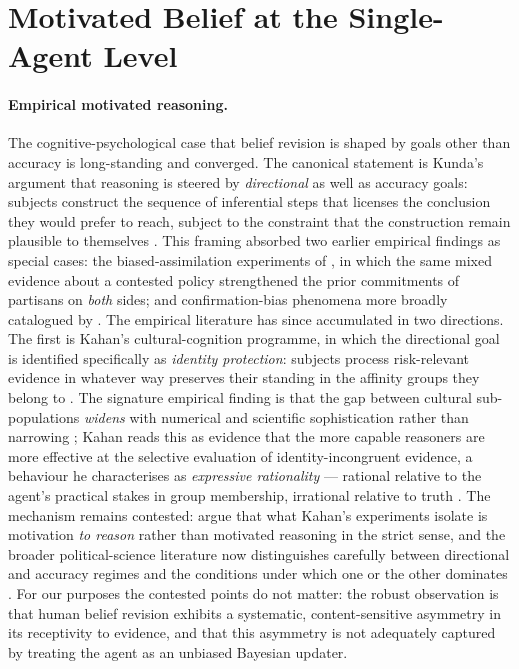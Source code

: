\section{Motivated Belief at the Single-Agent Level}
\label{sec:motivatedbelief}

\paragraph{Empirical motivated reasoning.}
The cognitive-psychological case that belief revision is shaped by
goals other than accuracy is long-standing and converged. The
canonical statement is Kunda's argument that reasoning is steered by
\emph{directional} as well as accuracy goals: subjects construct the
sequence of inferential steps that licenses the conclusion they would
prefer to reach, subject to the constraint that the construction
remain plausible to themselves \citep{kunda1990MotivatedReasoning}.
This framing absorbed two earlier empirical findings as special
cases: the biased-assimilation experiments of
\citet{lordRossLepper1979BiasedAssimilation}, in which the same
mixed evidence about a contested policy strengthened the prior
commitments of partisans on \emph{both} sides; and confirmation-bias
phenomena more broadly catalogued by \citet{nickerson1998ConfirmationBias}.
The empirical literature has since accumulated in two directions.
The first is Kahan's cultural-cognition programme, in which the
directional goal is identified specifically as \emph{identity
protection}: subjects process risk-relevant evidence in whatever way
preserves their standing in the affinity groups they belong to
\citep{Kahan2007_1, Kahan2017_4}. The signature empirical finding is
that the gap between cultural sub-populations \emph{widens} with
numerical and scientific sophistication rather than narrowing
\citep{Kahan2017_2}; Kahan reads this as evidence that the more
capable reasoners are more effective at the selective evaluation of
identity-incongruent evidence, a behaviour he characterises as
\emph{expressive rationality} --- rational relative to the agent's
practical stakes in group membership, irrational relative to truth
\citep{Kahan2015_12}. The mechanism remains contested:
\citet{Glüer-Pagin2024_11} argue that what Kahan's experiments
isolate is motivation \emph{to reason} rather than motivated reasoning
in the strict sense, and the broader political-science literature now
distinguishes carefully between directional and accuracy regimes and
the conditions under which one or the other dominates
\citep{Bolsen2019_7, Little2020_13, Savolainen2022_3}. For our
purposes the contested points do not matter: the robust observation
is that human belief revision exhibits a systematic, content-sensitive
asymmetry in its receptivity to evidence, and that this asymmetry is
not adequately captured by treating the agent as an unbiased Bayesian
updater.

